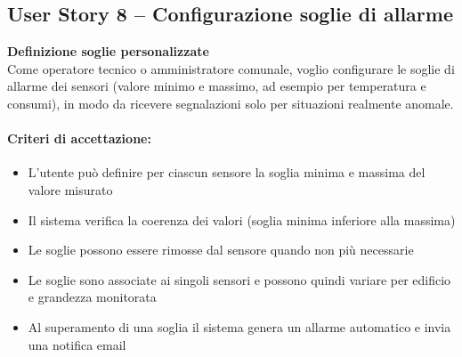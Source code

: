 \subsection{User Story 8 – Configurazione soglie di allarme}
\label{us:soglieAllarme}

\textbf{Definizione soglie personalizzate} \\
Come operatore tecnico o amministratore comunale, voglio configurare le soglie di allarme dei sensori (valore minimo e massimo, ad esempio per temperatura e consumi), in modo da ricevere segnalazioni solo per situazioni realmente anomale.

\paragraph*{Criteri di accettazione:}
\begin{itemize}
    \item L'utente può definire per ciascun sensore la soglia minima e massima del valore misurato
    \item Il sistema verifica la coerenza dei valori (soglia minima inferiore alla massima)
    \item Le soglie possono essere rimosse dal sensore quando non più necessarie
    \item Le soglie sono associate ai singoli sensori e possono quindi variare per edificio e grandezza monitorata
    \item Al superamento di una soglia il sistema genera un allarme automatico e invia una notifica email
\end{itemize}


